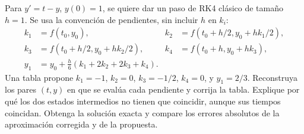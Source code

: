 Para \(y'=t-y\), \(y(0)=1\), se quiere dar un paso de RK4 clásico de tamaño \(h=1\). Se usa la convención de pendientes, sin incluir \(h\) en \(k_i\):
\[
\begin{aligned}
k_1&=f(t_0,y_0),&k_2&=f(t_0+h/2,y_0+hk_1/2),\\
k_3&=f(t_0+h/2,y_0+hk_2/2),&k_4&=f(t_0+h,y_0+hk_3),\\
y_1&=y_0+\frac h6(k_1+2k_2+2k_3+k_4).
\end{aligned}
\]
Una tabla propone \(k_1=-1\), \(k_2=0\), \(k_3=-1/2\), \(k_4=0\), y \(y_1=2/3\). Reconstruya los pares \((t,y)\) en que se evalúa cada pendiente y corrija la tabla. Explique por qué los dos estados intermedios no tienen que coincidir, aunque sus tiempos coincidan. Obtenga la solución exacta y compare los errores absolutos de la aproximación corregida y de la propuesta.
